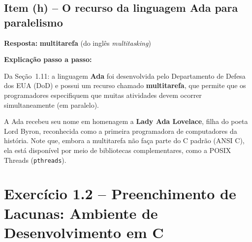 \documentclass[12pt,a4paper]{article}
\begin{document}
\subsection*{Item (h) -- O recurso da linguagem Ada para paralelismo}

\begin{respostabox}
\textbf{Resposta:} \textcolor{deitelblue}{\textbf{multitarefa} (do inglês \textit{multitasking})}

\medskip
\textbf{Explicação passo a passo:}

Da Seção~1.11: a linguagem \textbf{Ada} foi desenvolvida pelo Departamento de Defesa dos
EUA (DoD) e possui um recurso chamado \textbf{multitarefa}, que permite que os programadores
especifiquem que muitas atividades devem ocorrer simultaneamente (em paralelo).

A Ada recebeu seu nome em homenagem a \textbf{Lady Ada Lovelace}, filha do poeta Lord Byron,
reconhecida como a primeira programadora de computadores da história. Note que, embora a
multitarefa não faça parte do C padrão (ANSI C), ela está disponível por meio de bibliotecas
complementares, como a POSIX Threads (\texttt{pthreads}).
\end{respostabox}

\newpage

\section{Exercício 1.2 -- Preenchimento de Lacunas: Ambiente de Desenvolvimento em C}
\end{document}
